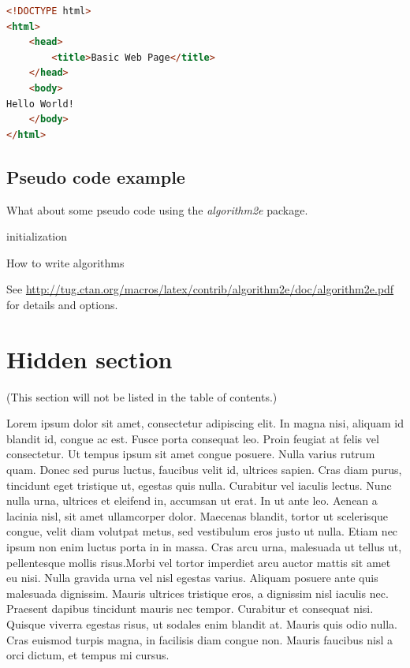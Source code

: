 \begin{lstlisting}[language=HTML,caption={Hello World in HTML},label={lst:helloworld},float=ht]
<!DOCTYPE html>
<html>
    <head>
        <title>Basic Web Page</title>
    </head>
    <body>
Hello World!
    </body>
</html>
\end{lstlisting}

\subsection{Pseudo code example}

What about some pseudo code using the \emph{algorithm2e} package.

\begin{algorithm}[H]
 \SetAlgoLined
 initialization\;
\caption{How to write algorithms}
\end{algorithm}

See \url{http://tug.ctan.org/macros/latex/contrib/algorithm2e/doc/algorithm2e.pdf} for details and options.

\tochide\section{Hidden section}

(This section will not be listed in the table of contents.)

Lorem ipsum dolor sit amet, consectetur adipiscing elit. In magna nisi, aliquam id blandit id, congue ac est. Fusce porta consequat leo. Proin feugiat at felis vel consectetur. Ut tempus ipsum sit amet congue posuere. Nulla varius rutrum quam. Donec sed purus luctus, faucibus velit id, ultrices sapien. Cras diam purus, tincidunt eget tristique ut, egestas quis nulla. Curabitur vel iaculis lectus. Nunc nulla urna, ultrices et eleifend in, accumsan ut erat. In ut ante leo. Aenean a lacinia nisl, sit amet ullamcorper dolor. Maecenas blandit, tortor ut scelerisque congue, velit diam volutpat metus, sed vestibulum eros justo ut nulla. Etiam nec ipsum non enim luctus porta in in massa. Cras arcu urna, malesuada ut tellus ut, pellentesque mollis risus.Morbi vel tortor imperdiet arcu auctor mattis sit amet eu nisi. Nulla gravida urna vel nisl egestas varius. Aliquam posuere ante quis malesuada dignissim. Mauris ultrices tristique eros, a dignissim nisl iaculis nec. Praesent dapibus tincidunt mauris nec tempor. Curabitur et consequat nisi. Quisque viverra egestas risus, ut sodales enim blandit at. Mauris quis odio nulla. Cras euismod turpis magna, in facilisis diam congue non. Mauris faucibus nisl a orci dictum, et tempus mi cursus.

